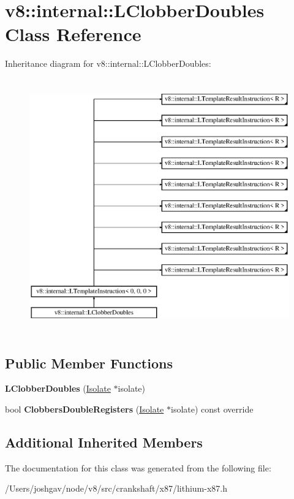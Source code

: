 \hypertarget{classv8_1_1internal_1_1_l_clobber_doubles}{}\section{v8\+:\+:internal\+:\+:L\+Clobber\+Doubles Class Reference}
\label{classv8_1_1internal_1_1_l_clobber_doubles}
Inheritance diagram for v8\+:\+:internal\+:\+:L\+Clobber\+Doubles\+:\begin{figure}[H]
\begin{center}
\leavevmode
\includegraphics[height=11.000000cm]{classv8_1_1internal_1_1_l_clobber_doubles}
\end{center}
\end{figure}
\subsection*{Public Member Functions}
\begin{DoxyCompactItemize}
\item 
{\bfseries L\+Clobber\+Doubles} (\hyperlink{classv8_1_1internal_1_1_isolate}{Isolate} $\ast$isolate)\hypertarget{classv8_1_1internal_1_1_l_clobber_doubles_a2bd3306c3557d59182b4a297269d5998}{}\label{classv8_1_1internal_1_1_l_clobber_doubles_a2bd3306c3557d59182b4a297269d5998}

\item 
bool {\bfseries Clobbers\+Double\+Registers} (\hyperlink{classv8_1_1internal_1_1_isolate}{Isolate} $\ast$isolate) const  override\hypertarget{classv8_1_1internal_1_1_l_clobber_doubles_aff8c76ebf15ba796b9e9303e9f6240b3}{}\label{classv8_1_1internal_1_1_l_clobber_doubles_aff8c76ebf15ba796b9e9303e9f6240b3}

\end{DoxyCompactItemize}
\subsection*{Additional Inherited Members}


The documentation for this class was generated from the following file\+:\begin{DoxyCompactItemize}
\item 
/\+Users/joshgav/node/v8/src/crankshaft/x87/lithium-\/x87.\+h\end{DoxyCompactItemize}

